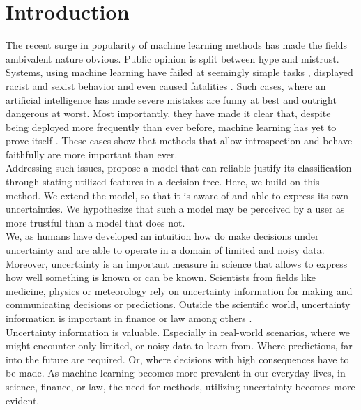 \documentclass[a4paper,cleardoubleempty,BCOR1cm, 11pt]{report}
\begin{document}
\tableofcontents



\chapter{Introduction}
The recent surge in popularity of machine learning methods has made the fields ambivalent nature obvious. Public opinion is split between hype and mistrust. 
Systems, using machine learning have failed at seemingly simple tasks \cite{kelion2018ces}, displayed racist and sexist behavior \cite{guynn2015google, schlesinger2018let, zou2018ai} and even caused fatalities \cite{yadron2016tesla}.
Such cases, where an artificial intelligence has made severe mistakes are funny at best and outright dangerous at worst. Most importantly, they have made it clear that, despite being deployed more frequently than ever before, machine learning has yet to prove itself \cite{schlesinger2018let, dikmen2016autonomous, zou2018ai}.
These cases show that methods that allow introspection and behave faithfully are more important than ever.\\
Addressing such issues, \citet{alaniz2019explainable} propose a model that can reliable justify its classification through stating utilized features in a decision tree. Here, we build on this method. We extend the model, so that it is aware of and able to express its own uncertainties. We hypothesize that such a model may be perceived by a user as more trustful than a model that does not.\\
We, as humans have developed an intuition how do make decisions under uncertainty \cite{bland2012different} and are able to operate in a domain of limited and noisy data. Moreover, uncertainty is an important measure in science that allows to express how well something is known or can be known. Scientists from fields like medicine, physics or meteorology rely on uncertainty information for making and communicating decisions or predictions. Outside the scientific world, uncertainty information is important in finance or law among others \cite{liu2013toward, d1983legal}.\\
Uncertainty information is valuable. Especially in real-world scenarios, where we might encounter only limited, or noisy data to learn from. Where predictions, far into the future are required. Or, where decisions with high consequences have to be made. 
As machine learning becomes more prevalent in our everyday lives, in science, finance, or law, the need for methods, utilizing uncertainty becomes more evident.\\
\end{document}
